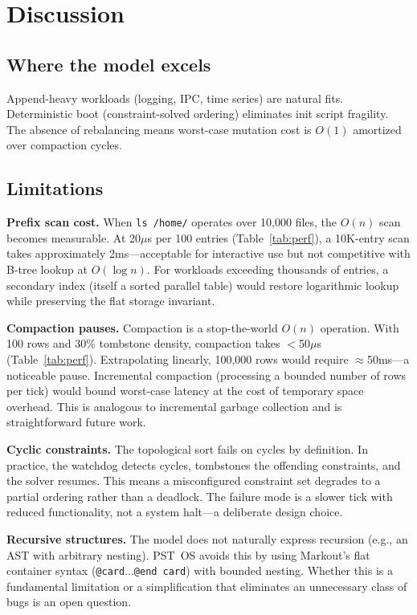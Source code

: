 \documentclass[11pt,a4paper]{article}
\begin{document}
\section{Discussion}

\subsection{Where the model excels}

Append-heavy workloads (logging, IPC, time series) are natural fits. Deterministic boot (constraint-solved ordering) eliminates init script fragility. The absence of rebalancing means worst-case mutation cost is $O(1)$ amortized over compaction cycles.

\subsection{Limitations}
\label{sec:limitations}

\textbf{Prefix scan cost.} When \texttt{ls /home/} operates over 10{,}000 files, the $O(n)$ scan becomes measurable. At 20$\mu$s per 100 entries (Table~\ref{tab:perf}), a 10K-entry scan takes approximately 2ms---acceptable for interactive use but not competitive with B-tree lookup at $O(\log n)$. For workloads exceeding thousands of entries, a secondary index (itself a sorted parallel table) would restore logarithmic lookup while preserving the flat storage invariant.

\textbf{Compaction pauses.} Compaction is a stop-the-world $O(n)$ operation. With 100 rows and 30\% tombstone density, compaction takes $<$50$\mu$s (Table~\ref{tab:perf}). Extrapolating linearly, 100{,}000 rows would require $\approx$50ms---a noticeable pause. Incremental compaction (processing a bounded number of rows per tick) would bound worst-case latency at the cost of temporary space overhead. This is analogous to incremental garbage collection and is straightforward future work.

\textbf{Cyclic constraints.} The topological sort fails on cycles by definition. In practice, the watchdog detects cycles, tombstones the offending constraints, and the solver resumes. This means a misconfigured constraint set degrades to a partial ordering rather than a deadlock. The failure mode is a slower tick with reduced functionality, not a system halt---a deliberate design choice.

\textbf{Recursive structures.} The model does not naturally express recursion (e.g., an AST with arbitrary nesting). PST~OS avoids this by using Markout's flat container syntax (\texttt{@card}...\texttt{@end card}) with bounded nesting. Whether this is a fundamental limitation or a simplification that eliminates an unnecessary class of bugs is an open question.
\end{document}
